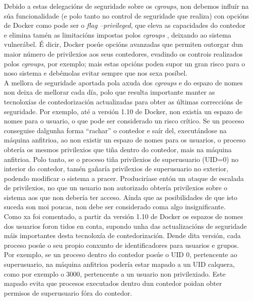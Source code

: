 Debido a estas delegacións de seguridade sobre os \textit{cgroups}, non debemos influír na súa funcionalidade (e polo tanto no control de seguridade que realiza) con opcións de Docker como pode ser o \textit{flag --privileged}, que eleva as capacidades do contedor e elimina tamén as limitacións impostas polos \textit{cgroups} \cite{state-of-art-docker-security}, deixando ao sistema vulnerábel. É dicir, Docker posúe opcións avanzadas que permiten outorgar dun maior número de privilexios aos seus contedores, evadindo os controis realizados polos \textit{cgroups}, por exemplo; mais estas opcións poden supor un gran risco para o noso sistema e debémolas evitar sempre que nos sexa posíbel.\\

A mellora de seguridade aportada pola axuda dos \textit{cgroups} e do espazo de nomes non deixa de mellorar cada día, polo que resulta importante manter as tecnoloxías de contedorización actualizadas para obter as últimas correccións de seguridade. Por exemplo, até a versión 1.10 de Docker, non existía un espazo de nomes para o usuario, o que pode ser considerado un risco crítico. Se un proceso conseguise dalgunha forma ``rachar'' o contedor e saír del, executándose na máquina anfitrioa, ao non existir un espazo de nomes para os usuarios, o proceso obtería os mesmos privilexios que tiña dentro do contedor, mais na máquina anfitrioa. Polo tanto, se o proceso tiña privilexios de superusuario (\gls{UID}=0) no interior do contedor, tamén gañaría privilexios de superusuario no exterior, podendo modificar o sistema a pracer. Produciríase entón un ataque de escalada de privilexios, no que un usuario non autorizado obtería privilexios sobre o sistema aos que non debería ter acceso. Aínda que as posibilidades de que isto suceda son moi poucas, non debe ser considerado coma algo insignificante.\\

Como xa foi comentado, a partir da versión 1.10 de Docker os espazos de nomes dos usuarios foron tidos en conta, supondo unha das actualizacións de seguridade máis importantes desta tecnoloxía de contedorización. Dende dita versión, cada proceso posúe o seu propio conxunto de identificadores para usuarios e grupos. Por exemplo, se un proceso dentro do contedor posúe o \gls{UID} 0, pertencente ao superusuario, na máquina anfitrioa podería estar mapado a un \gls{UID} calquera, como por exemplo o 3000, pertencente a un usuario non privilexiado. Este mapado evita que procesos executados dentro dun contedor poidan obter permisos de superusuario fóra do contedor. \cite{state-of-art-docker-security} \\

